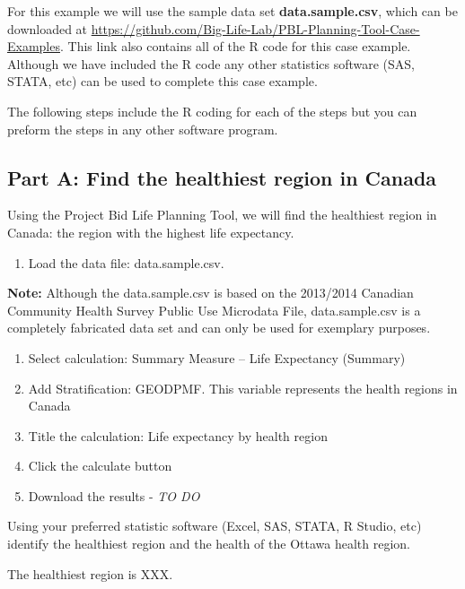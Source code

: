 \documentclass[]{book}
\providecommand{\tightlist}{%
  \setlength{\itemsep}{0pt}\setlength{\parskip}{0pt}}
\begin{document}
For this example we will use the sample data set \textbf{data.sample.csv}, which can be downloaded at \url{https://github.com/Big-Life-Lab/PBL-Planning-Tool-Case-Examples}. This link also contains all of the R code for this case example. Although we have included the R code any other statistics software (SAS, STATA, etc) can be used to complete this case example.

The following steps include the R coding for each of the steps but you can preform the steps in any other software program.

\hypertarget{part-a-find-the-healthiest-region-in-canada}{%
\subsection{Part A: Find the healthiest region in Canada}\label{part-a-find-the-healthiest-region-in-canada}}

Using the Project Bid Life Planning Tool, we will find the healthiest region in Canada: the region with the highest life expectancy.

\begin{enumerate}
\def\labelenumi{\arabic{enumi}.}
\tightlist
\item
  Load the data file: data.sample.csv.
\end{enumerate}

\textbf{Note:} Although the data.sample.csv is based on the 2013/2014 Canadian Community Health Survey Public Use Microdata File, data.sample.csv is a completely fabricated data set and can only be used for exemplary purposes.

\begin{enumerate}
\def\labelenumi{\arabic{enumi}.}
\setcounter{enumi}{1}
\item
  Select calculation: Summary Measure -- Life Expectancy (Summary)
\item
  Add Stratification: GEODPMF. This variable represents the health regions in Canada
\item
  Title the calculation: Life expectancy by health region
\item
  Click the calculate button
\item
  Download the results - \emph{TO DO}
\end{enumerate}

Using your preferred statistic software (Excel, SAS, STATA, R Studio, etc) identify the healthiest region and the health of the Ottawa health region.

The healthiest region is XXX.
\end{document}
